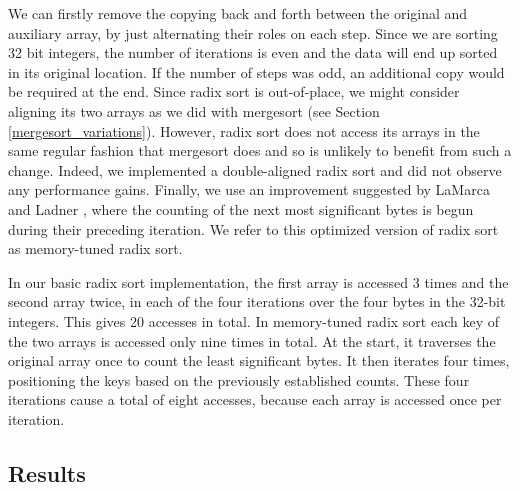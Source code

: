 \documentclass[acmtocl]{acmtrans2m}
\begin{document}
We can firstly remove the copying back and forth between the original and
auxiliary array, by just alternating their roles on each step. Since we are
sorting 32 bit integers, the number of iterations is even and the data will end
up sorted in its original location. If the number of steps was odd, an
additional copy would be required at the end. Since radix sort is out-of-place,
we might consider aligning its two arrays as we did with mergesort (see Section
\ref{mergesort_variations}). However, radix sort does not access its arrays in
the same regular fashion that mergesort does and so is unlikely to benefit from
such a change. Indeed, we implemented a double-aligned radix sort and did not
observe any performance gains.  Finally, we use an improvement suggested by
LaMarca and Ladner \citeyear{LaMarca97}, where the counting of the next most
significant bytes is begun during their preceding iteration. We refer to this
optimized version of radix sort as memory-tuned radix sort.

In our basic radix sort implementation, the first array is accessed 3 times and
the second array twice, in each of the four iterations over the four bytes in
the 32-bit integers. This gives 20 accesses in total.  In memory-tuned radix
sort each key of the two arrays is accessed only nine times in total.  At the
start, it traverses the original array once to count the least significant
bytes. It then iterates four times, positioning the keys based on the previously
established counts. These four iterations cause a total of eight accesses,
because each array is accessed once per iteration.

\subsection{Results}
\end{document}
